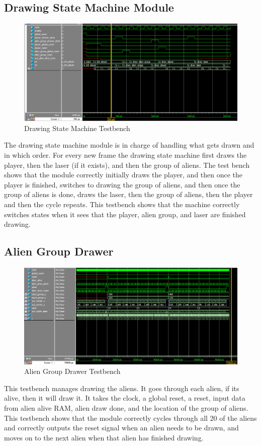 \documentclass[11pt, titlepage]{article}
\begin{document}
        \subsection{Drawing State Machine Module}
            \begin{figure}[H]
                \centering
                \includegraphics[scale = 0.53]{Images/Testbench Drawing State Machine.png}
                \caption{Drawing State Machine Testbench}
            \end{figure}
            The drawing state machine module is in charge of handling what gets drawn and in which order. For every new frame the drawing state machine first draws the player, then the laser (if it exists), and then the group of aliens. The test bench shows that the module correctly initially draws the player, and then once the player is finished, switches to drawing the group of aliens, and then once the group of aliens is done, draws the laser, then the group of aliens, then the player and then the cycle repeats. This testbench shows that the machine correctly switches states when it sees that the player, alien group, and laser are finished drawing.

        \subsection{Alien Group Drawer}
            \begin{figure}[H]
                \centering
                \includegraphics[scale = 0.53]{Images/Testbench Alien Group Drawer.png}
                \caption{Alien Group Drawer Testbench}
            \end{figure}
            This testbench manages drawing the aliens. It goes through each alien, if its alive, then it will draw it. It takes the clock, a global reset, a reset, input data from alien alive RAM, alien draw done, and the location of the group of aliens. This testbench shows that the module correctly cycles through all 20 of the aliens and correctly outputs the reset signal when an alien needs to be drawn, and moves on to the next alien when that alien has finished drawing.
\end{document}
